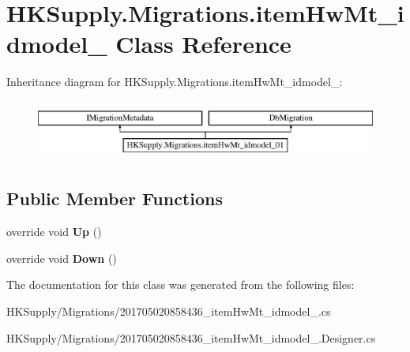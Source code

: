 \hypertarget{class_h_k_supply_1_1_migrations_1_1item_hw_mt__idmodel__01}{}\section{H\+K\+Supply.\+Migrations.\+item\+Hw\+Mt\+\_\+idmodel\+\_ Class Reference}
\label{class_h_k_supply_1_1_migrations_1_1item_hw_mt__idmodel__01}
Inheritance diagram for H\+K\+Supply.\+Migrations.\+item\+Hw\+Mt\+\_\+idmodel\+\_\+:\begin{figure}[H]
\begin{center}
\leavevmode
\includegraphics[height=2.000000cm]{class_h_k_supply_1_1_migrations_1_1item_hw_mt__idmodel__01}
\end{center}
\end{figure}
\subsection*{Public Member Functions}
\begin{DoxyCompactItemize}
\item 
\mbox{\label{class_h_k_supply_1_1_migrations_1_1item_hw_mt__idmodel__01_a4e38bc902185bf1fe9e2dffeac20e68e}} 
override void {\bfseries Up} ()
\item 
\mbox{\label{class_h_k_supply_1_1_migrations_1_1item_hw_mt__idmodel__01_a6344b73f4fcb044197b9af092c29d4fb}} 
override void {\bfseries Down} ()
\end{DoxyCompactItemize}


The documentation for this class was generated from the following files\+:\begin{DoxyCompactItemize}
\item 
H\+K\+Supply/\+Migrations/201705020858436\+\_\+item\+Hw\+Mt\+\_\+idmodel\+\_.\+cs\item 
H\+K\+Supply/\+Migrations/201705020858436\+\_\+item\+Hw\+Mt\+\_\+idmodel\+\_.\+Designer.\+cs\end{DoxyCompactItemize}
